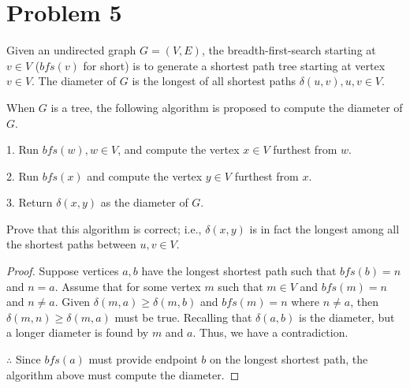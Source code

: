\documentclass[11pt]{article}
\begin{document}
\newpage
\section*{Problem 5}
Given an undirected graph $G=(V,E)$, the breadth-first-search starting at $v\in V$ ($bfs(v)$ for short) is to generate a shortest path tree starting at vertex $v\in V$. The diameter of $G$ is the longest of all shortest paths $\delta(u,v), u,v\in V$.
\newline

When $G$ is a tree, the following algorithm is proposed to compute the diameter of $G$.
\newline

1. Run $bfs(w), w\in V$, and compute the vertex $x\in V$ furthest from $w$.

2. Run $bfs(x)$ and compute the vertex $y\in V$ furthest from $x$.

3. Return $\delta(x,y)$ as the diameter of $G$.
\newline

Prove that this algorithm is correct; i.e., $\delta(x,y)$ is in fact the
longest among all the shortest paths between $u,v\in V$.

\begin{proof}
Suppose vertices $a,b$ have the longest shortest path such that $bfs(b) = n$ and $n = a$.
Assume that for some vertex $m$ such that $m \in V$ and $bfs(m) = n$ and $n \neq a$.
Given $\delta(m,a) \geq \delta(m,b)$ and $bfs(m) = n$ where $n \neq a$, then $\delta(m,n) \geq \delta(m,a)$ must be true. Recalling that $\delta(a,b)$ is the diameter, but a longer diameter is found by $m$ and $a$. Thus, we have a contradiction.
\newline

\noindent
$\therefore$ Since $bfs(a)$ must provide endpoint $b$ on the longest shortest path, the algorithm above must compute the diameter.
\end{proof}
\end{document}
